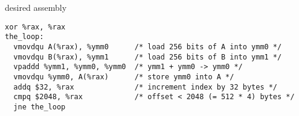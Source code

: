 
\begin{frame}[fragile,label=vecAddAsm]{desired assembly}
\begin{lstlisting}[language=myasm,style=smaller]
  xor %rax, %rax
the_loop:
  vmovdqu A(%rax), %ymm0      /* load 256 bits of A into ymm0 */
  vmovdqu B(%rax), %ymm1      /* load 256 bits of B into ymm1 */
  vpaddd %ymm1, %ymm0, %ymm0  /* ymm1 + ymm0 -> ymm0 */
  vmovdqu %ymm0, A(%rax)      /* store ymm0 into A */
  addq $32, %rax              /* increment index by 32 bytes */
  cmpq $2048, %rax            /* offset < 2048 (= 512 * 4) bytes */
  jne the_loop
\end{lstlisting}
\end{frame}
